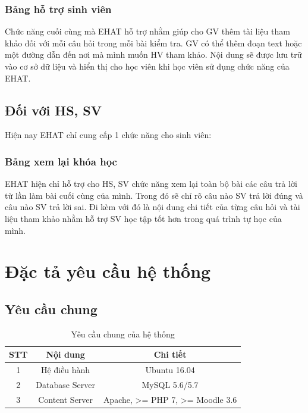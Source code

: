\subsubsection{Bảng hỗ trợ sinh viên}
Chức năng cuối cùng mà EHAT hỗ trợ nhằm giúp cho GV thêm tài liệu tham khảo đối với mỗi câu hỏi trong mỗi bài kiểm tra. GV có thể thêm đoạn text hoặc một đường dẫn đến nơi mà mình muốn HV tham khảo. Nội dung sẽ được lưu trữ vào cơ sở dữ liệu và hiển thị cho học viên khi học viên sử dụng chức năng của EHAT.

\subsection{Đối với HS, SV}

Hiện nay EHAT chỉ cung cấp 1 chức năng cho sinh viên:

\subsubsection{Bảng xem lại khóa học}
EHAT hiện chỉ hỗ trợ cho HS, SV chức năng xem lại toàn bộ bài các câu trả lời từ lần làm bài cuối cùng của mình. Trong đó sẽ chỉ rõ câu nào SV trả lời đúng và câu nào SV trả lời sai. Đi kèm với đó là nội dung chi tiết của từng câu hỏi và tài liệu tham khảo nhằm hỗ trợ SV học tập tốt hơn trong quá trình tự học của mình.

\newpage
\section{Đặc tả yêu cầu hệ thống}

\subsection{Yêu cầu chung}

\begin{center}
	\begin{table}[!htp]
		\centering
		\begin{tabular}{|c|c|c|}
			\hline 
			STT & Nội dung & Chi tiết \\ 
			\hline 
			1 & Hệ điều hành & Ubuntu 16.04 \\ 
			\hline 
			2 & Database Server & MySQL  5.6/5.7 \\ 
			\hline 
			3 & Content Server & Apache, >= PHP 7, >= Moodle 3.6 \\ 
			\hline 
		\end{tabular} 
		\caption{Yêu cầu chung của hệ thống}
		\label{bang20}
	\end{table}
\end{center}

